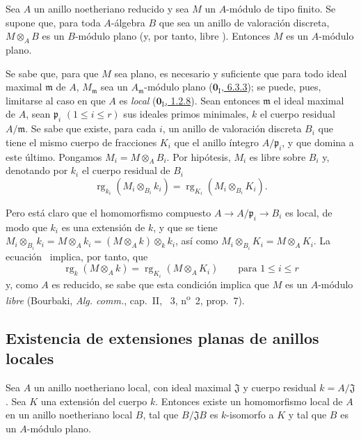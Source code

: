 \begin{proposition}[10.2.8]
\label{0.10.2.8}
\label{0.10.2.8-fr}
Sea $A$ un anillo noetheriano reducido y sea $M$ un $A$-módulo de tipo finito.
Se supone que, para toda $A$-álgebra $B$ que sea un anillo de valoración discreta, $M\otimes_A B$ es un $B$-módulo plano (y, por tanto, libre ).
Entonces $M$ es un $A$-módulo plano.
\end{proposition}


Se sabe que, para que $M$ sea plano, es necesario y suficiente que para todo ideal maximal $\mathfrak m$ de $A$, $M_{\mathfrak m}$ sea un $A_{\mathfrak m}$-módulo plano (\hyperref[0.6.3.3-fr]{$\mathbf{0}_{\mathrm I}$, 6.3.3}); se puede, pues, limitarse al caso en que $A$ es \emph{local} (\hyperref[0.1.2.8-fr]{$\mathbf{0}_{\mathrm I}$, 1.2.8}). Sean entonces $\mathfrak m$ el ideal maximal de $A$, sean $\mathfrak p_i$
$(1\leq i\leq r)$ sus ideales primos minimales, $k$ el cuerpo residual $A/\mathfrak m$.
Se sabe  que existe, para cada $i$, un anillo de valoración discreta $B_i$ que tiene el mismo cuerpo de fracciones $K_i$ que el anillo íntegro $A/\mathfrak p_i$, y que domina a este último. Pongamos $M_i=M\otimes_A B_i$.
Por hipótesis, $M_i$ es libre sobre $B_i$ y, denotando por $k_i$ el cuerpo residual de $B_i$
\[
\label{0.10.2.8.1-fr}
  \operatorname{rg}_{k_i}(M_i\otimes_{B_i}k_i)
  =\operatorname{rg}_{K_i}(M_i\otimes_{B_i}K_i).
  \tag{10.2.8.1}
\]

Pero está claro que el homomorfismo compuesto $A\to A/\mathfrak p_i\to B_i$ es local, de modo que $k_i$ es una extensión de $k$, y que se tiene $M_i\otimes_{B_i}k_i=M\otimes_A k_i=(M\otimes_A k)\otimes_k k_i$, así como $M_i\otimes_{B_i}K_i=M\otimes_A K_i$.
La ecuación~ implica, por tanto, que
\[
  \operatorname{rg}_k(M\otimes_A k)=\operatorname{rg}_{K_i}(M\otimes_A K_i)
  \qquad\text{para }1\leq i\leq r
\]
y, como $A$ es reducido, se sabe que esta condición implica que $M$ es un $A$-módulo \emph{libre} (Bourbaki, \emph{Alg. comm.}, cap.~II, \textsection~3, n\textsuperscript{o}~2, prop.~7).


\subsection{Existencia de extensiones planas de anillos locales}
\label{subsection:0.10.3}
\label{subsection:0.10.3-fr}

\begin{proposition}[10.3.1]
\label{0.10.3.1}
\label{0.10.3.1-fr}
Sea $A$ un anillo noetheriano local, con ideal maximal $\mathfrak J$ y cuerpo residual $k=A/\mathfrak J$.
Sea $K$ una extensión del cuerpo $k$.
Entonces existe un homomorfismo local de $A$ en un anillo noetheriano local $B$, tal que $B/\mathfrak J B$ es $k$-isomorfo a $K$ y tal que $B$ es un $A$-módulo plano.
\end{proposition}

